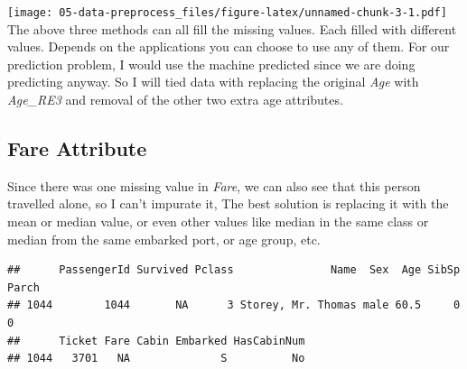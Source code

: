 \documentclass[
]{book}
\newenvironment{Shaded}{\begin{snugshade}}{\end{snugshade}}
\newcommand{\CommentTok}[1]{\textcolor[rgb]{0.56,0.35,0.01}{\textit{#1}}}
\newcommand{\DataTypeTok}[1]{\textcolor[rgb]{0.13,0.29,0.53}{#1}}
\newcommand{\KeywordTok}[1]{\textcolor[rgb]{0.13,0.29,0.53}{\textbf{#1}}}
\newcommand{\NormalTok}[1]{#1}
\newcommand{\OperatorTok}[1]{\textcolor[rgb]{0.81,0.36,0.00}{\textbf{#1}}}
\newcommand{\StringTok}[1]{\textcolor[rgb]{0.31,0.60,0.02}{#1}}
\begin{document}
\texttt{[image: 05-data-preprocess\_files/figure-latex/unnamed-chunk-3-1.pdf]}
The above three methods can all fill the missing values. Each filled with different values. Depends on the applications you can choose to use any of them. For our prediction problem, I would use the machine predicted since we are doing predicting anyway. So I will tied data with replacing the original \emph{Age} with \emph{Age\_RE3} and removal of the other two extra age attributes.

\begin{Shaded}
\end{Shaded}

\hypertarget{fare-attribute}{%
\subsection*{Fare Attribute}\label{fare-attribute}}


Since there was one missing value in \emph{Fare}, we can also see that this person travelled alone, so I can't impurate it, The best solution is replacing it with the mean or median value, or even other values like median in the same class or median from the same embarked port, or age group, etc.

\begin{Shaded}
\end{Shaded}

\begin{verbatim}
##      PassengerId Survived Pclass               Name  Sex  Age SibSp Parch
## 1044        1044       NA      3 Storey, Mr. Thomas male 60.5     0     0
##      Ticket Fare Cabin Embarked HasCabinNum
## 1044   3701   NA              S          No
\end{verbatim}

\begin{Shaded}
\end{Shaded}
\end{document}
